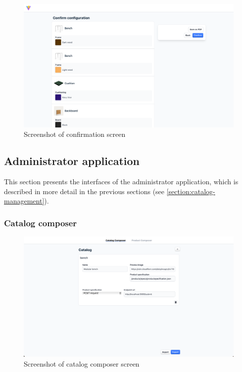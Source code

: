 \begin{figure}[h]
\centering
\includegraphics[width=\textwidth]{images/screenshot_confirmation.png}
\caption{Screenshot of confirmation screen}
\label{fig:screenshot-confirmation}
\end{figure}

\subsection{Administrator application}

This section presents the interfaces of the administrator application, which is described in more detail in the previous sections (see \autoref{section:catalog-management}).

\subsubsection{Catalog composer}

\begin{figure}[h]
\centering
\includegraphics[width=\textwidth]{images/screenshot_catalogcomposer.png}
\caption{Screenshot of catalog composer screen}
\label{fig:screenshot-catalogcomposer}
\end{figure}

